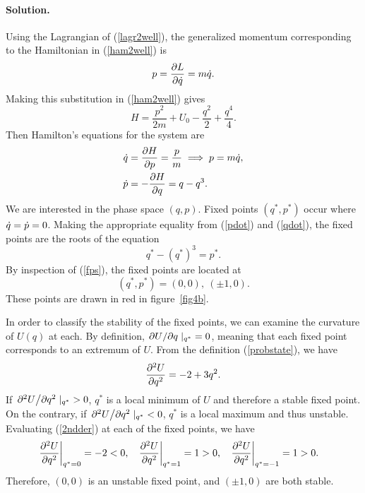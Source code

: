 \documentclass[11pt]{article}
\newcommand{\refeq}[1]{(\ref{#1})}
\newenvironment{solution}
{
    \paragraph{Solution.}
    \ignorespaces
}
{
    \bigskip
}
\begin{document}
\begin{solution}
	Using the Lagrangian of \refeq{lagr2well}, the generalized momentum corresponding to the Hamiltonian in \refeq{ham2well} is
	\begin{equation}
		p = \pdv{L}{\dot{q}} = m\dot{q}.
	\end{equation}
	Making this substitution in \refeq{ham2well} gives
	\begin{equation} \label{ham2well2}
		H = \frac{p^2}{2m} + U_0 - \frac{q^2}{2} + \frac{q^4}{4}.
	\end{equation}
	Then Hamilton's equations for the system are
	\begin{align}
		\dot{q} &= \pdv{H}{p} = \frac{p}{m} \implies p = m\dot{q}, \label{qdot} \\
		\dot{p} &= -\pdv{H}{q} = q - q^3. \label{pdot}
	\end{align}
	We are interested in the phase space $(q, p)$.  Fixed points $(q^*, p^*)$ occur where $\dot{q} = \dot{p} = 0$.  Making the appropriate equality from \refeq{pdot} and \refeq{qdot}, the fixed points are the roots of the equation
	\begin{equation} \label{fps}
		q^* - (q^*)^3 = p^*.
	\end{equation}
	By inspection of \refeq{fps}, the fixed points are located at
	\begin{equation}
		(q^*, p^*) = (0,0), \ (\pm 1, 0).
	\end{equation}
	These points are drawn in red in figure~\ref{fig4b}.
	
	In order to classify the stability of the fixed points, we can examine the curvature of $U(q)$ at each.  By definition, $\pdv*{U}{q}|_{q^*} = 0$, meaning that each fixed point corresponds to an extremum of $U$.  From the definition \refeq{probstate}, we have
	\begin{equation} \label{2ndder}
		\pdv[2]{U}{q} = -2 + 3 q^2.
	\end{equation}
	If $\pdv*[2]{U}{q}|_{q^*} > 0$, $q^*$ is a local minimum of $U$ and therefore a stable fixed point.  On the contrary, if $\pdv*[2]{U}{q}|_{q^*} < 0$, $q^*$ is a local maximum and thus unstable.  Evaluating \refeq{2ndder} at each of the fixed points, we have
	\begin{align}
		\left. \pdv[2]{U}{q} \right|_{q^* = 0} &= -2 < 0, &
		\left. \pdv[2]{U}{q} \right|_{q^* = 1} &= 1 > 0, &
		\left. \pdv[2]{U}{q} \right|_{q^* = -1} &= 1 > 0.
	\end{align}
	Therefore, $(0, 0)$ is an unstable fixed point, and $(\pm 1, 0)$ are both stable.
	

\end{solution}
\end{document}
